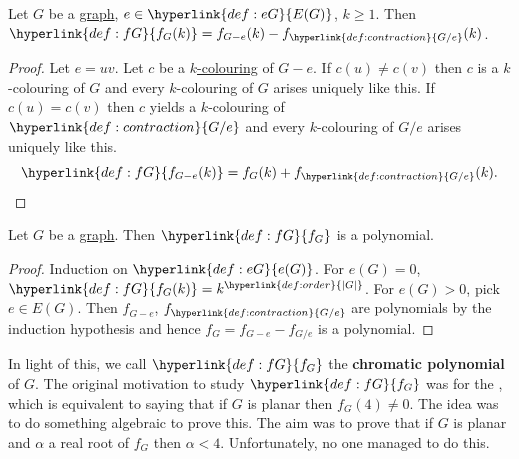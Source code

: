\documentclass{article}
\begin{document}
\begin{nthm}\label{thm:43}
    Let $G$ be a \hyperlink{def:graph}{graph}, $e \in \hyperlink{def:eG}{E(G)}$, $k \geq 1$. Then $\hyperlink{def:fG}{f_G(k)} = f_{G-e}(k) - f_{\hyperlink{def:contraction}{G/e}} (k)$.
\end{nthm}
\begin{proof}
    Let $e = uv$. Let $c$ be a \hyperlink{def:colour}{$k$-colouring} of $G-e$.
    If $c(u) \neq c(v)$ then $c$ is a $k$-colouring of $G$ and every $k$-colouring of $G$ arises uniquely like this.
    If $c(u) = c(v)$ then $c$ yields a $k$-colouring of $\hyperlink{def:contraction}{G/e}$ and every $k$-colouring of $G/e$ arises uniquely like this.
    \begin{equation*}
        \hyperlink{def:fG}{f_{G-e}(k)} = f_G(k) + f_{\hyperlink{def:contraction}{G/e}} (k). \qedhere
    \end{equation*}
\end{proof}
\begin{ncor}\label{cor:44}
    Let $G$ be a \hyperlink{def:graph}{graph}. Then $\hyperlink{def:fG}{f_G}$ is a polynomial.
\end{ncor}
\begin{proof}
    Induction on $\hyperlink{def:eG}{e(G)}$. For $e(G) = 0$, $\hyperlink{def:fG}{f_G(k)} = k^{\hyperlink{def:order}{|G|}}$.
    For $e(G) > 0$, pick $e \in E(G)$. Then $f_{G-e}$, $f_{\hyperlink{def:contraction}{G/e}}$ are polynomials by the induction hypothesis and hence $f_G = f_{G-e} - f_{G/e}$ is a polynomial.
\end{proof}

In light of this, we call $\hyperlink{def:fG}{f_G}$ the \textbf{chromatic polynomial} of $G$.
The original motivation to study $\hyperlink{def:fG}{f_G}$ was for the , which is equivalent to saying that if $G$ is planar then $f_G(4) \neq 0$.
The idea was to do something algebraic to prove this. The aim was to prove that if $G$ is planar and $\alpha$ a real root of $f_G$ then $\alpha < 4$.
Unfortunately, no one managed to do this.
\end{document}

